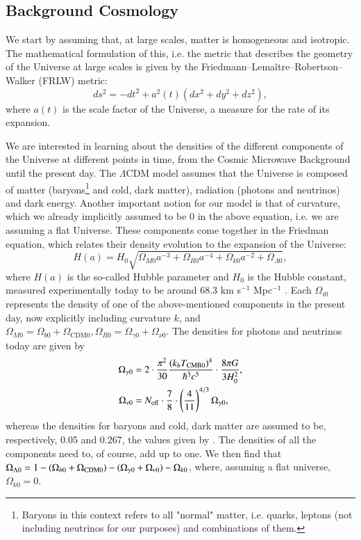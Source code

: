 \documentclass{aa}
\begin{document}
\subsection{Background Cosmology}

We start by assuming that, at large scales, matter is homogeneous and isotropic. The mathematical formulation of this, i.e. the metric that describes the geometry of the Universe at large scales is given by the Friedmann–Lemaître–Robertson–Walker (FRLW) metric:
\begin{equation}
ds^2 = -dt^2 + a^2(t)(dx^2 + dy^2 + dz^2),
\end{equation}
where $a(t)$ is the scale factor of the Universe, a measure for the rate of its expansion.

We are interested in learning about the densities of the different components of the Universe at different points in time, from the Cosmic Microwave Background until the present day. The $\Lambda$CDM model assumes that the Universe is composed of matter (baryons\footnote{Baryons in this context refers to all "normal" matter, i.e. quarks, leptons (not including neutrinos for our purposes) and combinations of them.} and cold, dark matter), radiation (photons and neutrinos) and dark energy. Another important notion for our model is that of curvature, which we already implicitly assumed to be 0 in the above equation, i.e. we are assuming a flat Universe. These components come together in the Friedman equation, which relates their density evolution to the expansion of the Universe:
\begin{equation}
H(a) = H_0 \sqrt{\Omega_{M0}a^{-3} + \Omega_{R0}a^{-4} + \Omega_{k 0} a^{-2} + \Omega_{\Lambda 0}},
\end{equation}
where $H(a)$ is the so-called Hubble parameter and $H_0$ is the Hubble constant, measured experimentally today to be around 68.3 km s$^{-1}$ Mpc$^{-1}$ \citep{Kozmanyan_2019}. Each $\Omega_{i0}$ represents the density of one of the above-mentioned components in the present day, now explicitly including curvature $k$, and $\Omega_{M0} = \Omega_{b0} + \Omega_\text{CDM0}, \Omega_{R0} = \Omega_{\gamma0} + \Omega_{\nu0}$. The densities for photons and neutrinos today are given by
\begin{align}
\Omega_{\gamma 0} &= 2\cdot \frac{\pi^2}{30} \frac{(k_bT_{\rm CMB 0})^4}{\hbar^3 c^5} \cdot \frac{8\pi G}{3H_0^2},\\
\Omega_{\nu 0} &= N_{\rm eff}\cdot \frac{7}{8}\cdot \left(\frac{4}{11}\right)^{4/3}\Omega_{\gamma 0},
\end{align}
whereas the densities for baryons and cold, dark matter are assumed to be, respectively, 0.05 and 0.267, the values given by \cite{2020}. The densities of all the components need to, of course, add up to one. We then find that 
$\Omega_{\Lambda 0} = 1 - (\Omega_{b 0}+\Omega_{\rm CDM 0}) - (\Omega_{\gamma 0} + \Omega_{\nu 0}) - \Omega_{k 0}$, where, assuming a flat universe, $\Omega_{k 0} = 0$.
\end{document}
